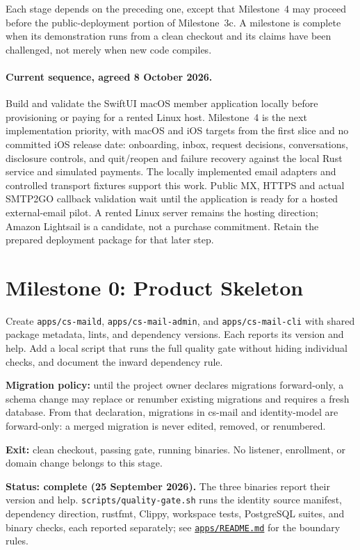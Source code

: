 \documentclass[11pt]{article}
\begin{document}
Each stage depends on the preceding one, except that Milestone~4 may proceed
before the public-deployment portion of Milestone~3c. A milestone is complete
when its demonstration runs from a clean checkout and its claims have been
challenged, not merely when new code compiles.

\paragraph{Current sequence, agreed 8 October 2026.}
Build and validate the SwiftUI macOS member application locally before provisioning
or paying for a rented Linux host. Milestone~4 is the next implementation priority,
with macOS and iOS targets from the first slice and no committed iOS release date:
onboarding, inbox, request decisions, conversations, disclosure controls, and
quit/reopen and failure recovery against the local Rust service and simulated
payments. The locally implemented email adapters and controlled transport fixtures
support this work. Public MX, HTTPS and actual SMTP2GO callback validation wait
until the application is ready for a hosted external-email pilot. A rented Linux
server remains the hosting direction; Amazon Lightsail is a candidate, not a
purchase commitment. Retain the prepared deployment package for that later step.

\section{Milestone 0: Product Skeleton}

Create \texttt{apps/cs-maild}, \texttt{apps/cs-mail-admin}, and
\texttt{apps/cs-mail-cli} with shared package metadata, lints, and dependency
versions. Each reports its version and help. Add a local script that runs the
full quality gate without hiding individual checks, and document the inward
dependency rule.

\textbf{Migration policy:} until the project owner declares migrations
forward-only, a schema change may replace or renumber existing migrations and
requires a fresh database. From that declaration, migrations in cs-mail and
identity-model are forward-only: a merged migration is never edited, removed, or
renumbered.

\textbf{Exit:} clean checkout, passing gate, running binaries. No listener,
enrollment, or domain change belongs to this stage.

\textbf{Status: complete (25 September 2026).} The three binaries report their
version and help. \texttt{scripts/quality-gate.sh} runs the identity source
manifest, dependency direction, rustfmt, Clippy, workspace tests, PostgreSQL
suites, and binary checks, each reported separately; see
\href{apps/README.md}{\texttt{apps/README.md}} for the boundary rules.
\end{document}
